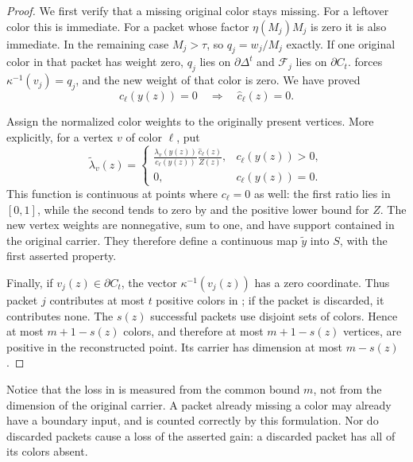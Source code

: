 \begin{proof}
We first verify that a missing original color stays missing.
For a leftover color this is immediate.  For a packet whose
factor $\eta(M_j)M_j$ is zero it is also immediate.  In the
remaining case $M_j>\tau$, so $q_j=w_j/M_j$ exactly.  If one
original color in that packet has weight zero, $q_j$ lies on
$\partial\Delta^t$ and $\mathcal F_j$ lies on $\partial C_t$.
 forces
$\kappa^{-1}(v_j)=q_j$, and the new weight of that color is
zero.  We have proved
\begin{equation}
\label{eq:no-new-colors}
 c_\ell(y(z))=0\quad\Longrightarrow\quad
 \widehat c_\ell(z)=0.
\end{equation}

Assign the normalized color weights to the originally present
vertices.  More explicitly, for a vertex $v$ of color $\ell$,
put
\begin{equation}
\label{eq:reconstructed-vertices}
 \widetilde\lambda_v(z)=
 \begin{cases}
 \displaystyle
 \frac{\lambda_v(y(z))}{c_\ell(y(z))}
 \frac{\widehat c_\ell(z)}{Z(z)},
       &c_\ell(y(z))>0,\\[3mm]
 0,    &c_\ell(y(z))=0.
 \end{cases}
\end{equation}
This function is continuous at points where $c_\ell=0$ as well:
the first ratio lies in $[0,1]$, while the second tends to zero
by  and the positive lower bound for $Z$.
The new vertex weights are nonnegative, sum to one, and have
support contained in the original carrier.  They therefore
define a continuous map $\widetilde y$ into $S$, with the first
asserted property.

Finally, if $v_j(z)\in\partial C_t$, the vector
$\kappa^{-1}(v_j(z))$ has a zero coordinate.  Thus packet $j$
contributes at most $t$ positive colors in
; if the packet is discarded,
it contributes none.  The $s(z)$ successful packets use disjoint
sets of colors.  Hence at most $m+1-s(z)$ colors, and therefore
at most $m+1-s(z)$ vertices, are positive in the reconstructed
point.  Its carrier has dimension at most $m-s(z)$.
\end{proof}

Notice that the loss in  is measured
from the common bound $m$, not from the dimension of the original
carrier.  A packet already missing a color may already have a
boundary input, and is counted correctly by this formulation.
Nor do discarded packets cause a loss of the asserted gain: a
discarded packet has all of its colors absent.
